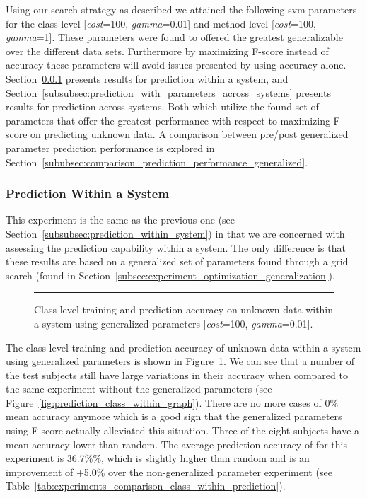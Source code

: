 Using our search strategy as described we attained the following \gls{svm} parameters for the class-level [\emph{cost}=100, \emph{gamma}=0.01] and method-level [\emph{cost}=100, \emph{gamma}=1]. These parameters were found to offered the greatest generalizable over the different data sets. Furthermore by maximizing F-score instead of accuracy these parameters will avoid issues presented by using accuracy alone. Section~\ref{subsubsec:prediction_with_parameters_within_system} presents results for prediction within a system, and Section~\ref{subsubsec:prediction_with_parameters_across_systems} presents results for prediction across systems. Both which utilize the found set of parameters that offer the greatest performance with respect to maximizing F-score on predicting unknown data. A comparison between pre/post generalized parameter prediction performance is explored in Section~\ref{sububsec:comparison_prediction_performance_generalized}.


\subsubsection{Prediction Within a System}
\label{subsubsec:prediction_with_parameters_within_system}
This experiment is the same as the previous one (see Section~\ref{subsubsec:prediction_within_system}) in that we are concerned with assessing the prediction capability within a system. The only difference is that these results are based on a generalized set of parameters found through a grid search (found in Section~\ref{subsec:experiment_optimization_generalization}).

\begin{figure}[!tb]
  \centering
  \begin{adjustbox}{max size={\textwidth}{\textheight}}
    
  \end{adjustbox}
  \caption{Class-level training and prediction accuracy on unknown data within a system using generalized parameters [\emph{cost}=100, \emph{gamma}=0.01].}
  \vspace{2mm}
  \hrule
  \label{fig:prediction_with_parameters_class_within_graph}
\end{figure}

The class-level training and prediction accuracy of unknown data within a system using generalized parameters is shown in Figure~\ref{fig:prediction_with_parameters_class_within_graph}. We can see that a number of the test subjects still have large variations in their accuracy when compared to the same experiment without the generalized parameters (see Figure~\ref{fig:prediction_class_within_graph}). There are no more cases of 0\% mean accuracy anymore which is a good sign that the generalized parameters using F-score actually alleviated this situation. Three of the eight subjects have a mean accuracy lower than random. The average prediction accuracy of for this experiment is 36.7\%\%, which is slightly higher than random and is an improvement of +5.0\% over the non-generalized parameter experiment (see Table~\ref{tab:experiments_comparison_class_within_prediction}).

